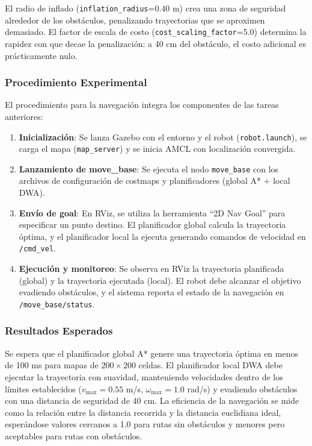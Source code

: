 \documentclass[12pt,letterpaper]{article}
\begin{document}
El radio de inflado (\texttt{inflation\_radius}=0.40 m) crea una zona de seguridad alrededor de los obstáculos, penalizando trayectorias que se aproximen demasiado. El factor de escala de costo (\texttt{cost\_scaling\_factor}=5.0) determina la rapidez con que decae la penalización: a 40 cm del obstáculo, el costo adicional es prácticamente nulo.

\subsubsection{Procedimiento Experimental}

El procedimiento para la navegación integra los componentes de las tareas anteriores:

\begin{enumerate}
    \item \textbf{Inicialización}: Se lanza Gazebo con el entorno y el robot (\texttt{robot.launch}), se carga el mapa (\texttt{map\_server}) y se inicia AMCL con localización convergida.
    \item \textbf{Lanzamiento de move\_base}: Se ejecuta el nodo \texttt{move\_base} con los archivos de configuración de costmaps y planificadores (global A* + local DWA).
    \item \textbf{Envío de goal}: En RViz, se utiliza la herramienta ``2D Nav Goal'' para especificar un punto destino. El planificador global calcula la trayectoria óptima, y el planificador local la ejecuta generando comandos de velocidad en \texttt{/cmd\_vel}.
    \item \textbf{Ejecución y monitoreo}: Se observa en RViz la trayectoria planificada (global) y la trayectoria ejecutada (local). El robot debe alcanzar el objetivo evadiendo obstáculos, y el sistema reporta el estado de la navegación en \texttt{/move\_base/status}.
\end{enumerate}

\subsubsection{Resultados Esperados}

Se espera que el planificador global A* genere una trayectoria óptima en menos de 100 ms para mapas de $200\times200$ celdas. El planificador local DWA debe ejecutar la trayectoria con suavidad, manteniendo velocidades dentro de los límites establecidos ($v_\text{max}=0.55$ m/s, $\omega_\text{max}=1.0$ rad/s) y evadiendo obstáculos con una distancia de seguridad de 40 cm. La eficiencia de la navegación se mide como la relación entre la distancia recorrida y la distancia euclidiana ideal, esperándose valores cercanos a 1.0 para rutas sin obstáculos y menores pero aceptables para rutas con obstáculos.
\end{document}
